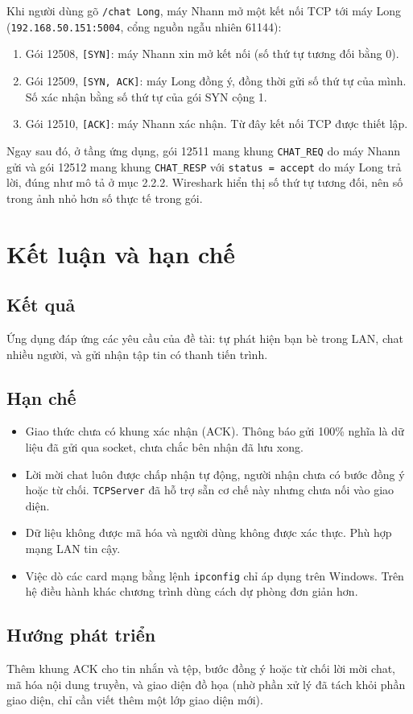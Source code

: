 \documentclass[a4paper,12pt]{article}
\newcommand{\code}[1]{\texttt{#1}}
\begin{document}
Khi người dùng gõ \code{/chat Long}, máy Nhann mở một kết nối TCP tới máy Long (\code{192.168.50.151:5004}, cổng nguồn ngẫu nhiên 61144):
\begin{enumerate}
\item Gói 12508, \code{[SYN]}: máy Nhann xin mở kết nối (số thứ tự tương đối bằng 0).
\item Gói 12509, \code{[SYN, ACK]}: máy Long đồng ý, đồng thời gửi số thứ tự của mình. Số xác nhận bằng số thứ tự của gói SYN cộng 1.
\item Gói 12510, \code{[ACK]}: máy Nhann xác nhận. Từ đây kết nối TCP được thiết lập.
\end{enumerate}
Ngay sau đó, ở tầng ứng dụng, gói 12511 mang khung \code{CHAT\_REQ} do máy Nhann gửi và gói 12512 mang khung \code{CHAT\_RESP} với \code{status = accept} do máy Long trả lời, đúng như mô tả ở mục 2.2.2. Wireshark hiển thị số thứ tự tương đối, nên số trong ảnh nhỏ hơn số thực tế trong gói.

\section{Kết luận và hạn chế}

\subsection{Kết quả}
Ứng dụng đáp ứng các yêu cầu của đề tài: tự phát hiện bạn bè trong LAN, chat nhiều người, và gửi nhận tập tin có thanh tiến trình.

\subsection{Hạn chế}
\begin{itemize}
\item Giao thức chưa có khung xác nhận (ACK). Thông báo gửi 100\% nghĩa là dữ liệu đã gửi qua socket, chưa chắc bên nhận đã lưu xong.
\item Lời mời chat luôn được chấp nhận tự động, người nhận chưa có bước đồng ý hoặc từ chối. \code{TCPServer} đã hỗ trợ sẵn cơ chế này nhưng chưa nối vào giao diện.
\item Dữ liệu không được mã hóa và người dùng không được xác thực. Phù hợp mạng LAN tin cậy.
\item Việc dò các card mạng bằng lệnh \code{ipconfig} chỉ áp dụng trên Windows. Trên hệ điều hành khác chương trình dùng cách dự phòng đơn giản hơn.
\end{itemize}

\subsection{Hướng phát triển}
Thêm khung ACK cho tin nhắn và tệp, bước đồng ý hoặc từ chối lời mời chat, mã hóa nội dung truyền, và giao diện đồ họa (nhờ phần xử lý đã tách khỏi phần giao diện, chỉ cần viết thêm một lớp giao diện mới).
\end{document}
